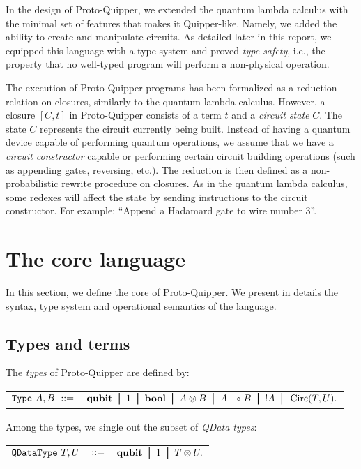 \documentclass[twoside]{article}
\begin{document}
In the design of Proto-Quipper, we extended the quantum lambda
calculus with the minimal set of features that makes it Quipper-like.
Namely, we added the ability to create and manipulate circuits.  As
detailed later in this report, we equipped this language with a type
system and proved {\em type-safety}, i.e., the property that no
well-typed program will perform a non-physical operation.

The execution of Proto-Quipper programs has been formalized as a
reduction relation on closures, similarly to the quantum lambda
calculus.  However, a closure $[C,t]$ in Proto-Quipper consists of a
term $t$ and a \emph{circuit state} $C$. The state $C$ represents the
circuit currently being built. Instead of having a quantum device
capable of performing quantum operations, we assume that we have a
\emph{circuit constructor} capable or performing certain circuit
building operations (such as appending gates, reversing, etc.). The
reduction is then defined as a non-probabilistic rewrite procedure on
closures.  As in the quantum lambda calculus, some redexes will affect
the state by sending instructions to the circuit constructor. For
example: ``Append a Hadamard gate to wire number 3''.


\clearpage
\section{The core language}\label{sec-core}

In this section, we define the core of Proto-Quipper. We 
present in details the syntax, type system and 
operational semantics of the language.

\subsection{Types and terms}
\label{ssec-types-and-terms}

\begin{definition} 
The \emph{types} of Proto-Quipper are defined by:
\begin{center}
\begin{tabular}{rl}
$\texttt{Type}~A,B~::=$ & $ \qubit \bor 1 \bor \bool \bor A\tensor B \bor 
A\loli B \bor !A \bor \Circ (T,U).$\\
\end{tabular}
\end{center}
Among the types, we single out the subset of \emph{QData types}:
\begin{center}
\begin{tabular}{rcl}
$\texttt{QDataType}~T,U$ & $::=$ & $\qubit \bor 1 \bor T \tensor U.$
\end{tabular}
\end{center}
\end{definition}
\end{document}

